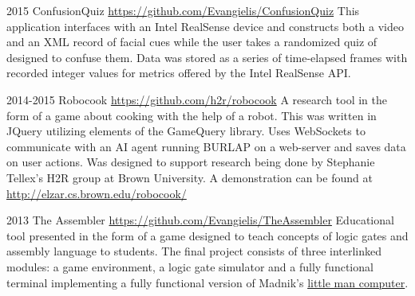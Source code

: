 \documentclass[]{friggeri-cv} %
\begin{document}
\begin{entrylist}
\entry
{2015}
{ConfusionQuiz}
{\href{https://github.com/Evangielis/ConfusionQuiz}{https://github.com/Evangielis/ConfusionQuiz}}
{This application interfaces with an Intel RealSense device and constructs both a video and an XML record of facial cues while the user takes a randomized quiz of designed to confuse them.  Data was stored as a series of time-elapsed frames with recorded integer values for metrics offered by the Intel RealSense API.}

\entry
{2014-2015}
{Robocook}
{\href{https://github.com/h2r/robocook}{https://github.com/h2r/robocook}}
{A research tool in the form of a game about cooking with the help of a robot.  This was written in JQuery utilizing elements of the GameQuery library.  Uses WebSockets to communicate with an AI agent running BURLAP on a web-server and saves data on user actions.  Was designed to support research being done by Stephanie Tellex's H2R group at Brown University.  A demonstration can be found at \href{http://elzar.cs.brown.edu/robocook/}{http://elzar.cs.brown.edu/robocook/}}

\entry
{2013}
{The Assembler}
{\href{https://github.com/Evangielis/TheAssembler}{https://github.com/Evangielis/TheAssembler}}
{Educational tool presented in the form of a game designed to teach concepts of logic gates and assembly language to students.  The final project consists of three interlinked modules: a game environment, a logic gate simulator and a fully functional terminal implementing a fully functional version of Madnik's \href{https://en.wikipedia.org/wiki/Little_man_computer.}{little man computer}.}


\end{entrylist}





\end{document}
